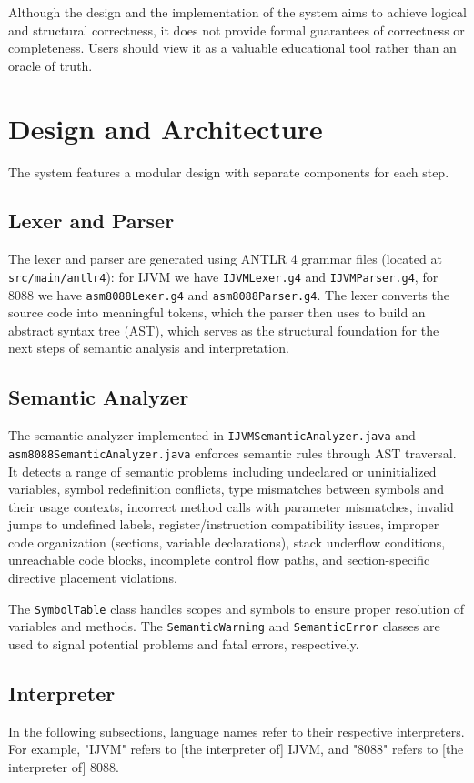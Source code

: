 \documentclass[11pt]{article}
\begin{document}
Although the design and the implementation of the system aims to achieve logical and structural correctness, it does not provide formal guarantees of correctness or completeness. Users should view it as a valuable educational tool rather than an oracle of truth.

\section{Design and Architecture}
The system features a modular design with separate components for each step.

\subsection{Lexer and Parser}
The lexer and parser are generated using ANTLR 4 grammar files (located at \texttt{src/main/antlr4}): for IJVM we have \texttt{IJVMLexer.g4} and \texttt{IJVMParser.g4}, for 8088 we have \texttt{asm8088Lexer.g4} and \texttt{asm8088Parser.g4}.  The lexer converts the source code into meaningful tokens, which the parser then uses to build an abstract syntax tree (AST), which serves as the structural foundation for the next steps of  semantic analysis and interpretation.

\subsection{Semantic Analyzer}
The semantic analyzer implemented in \texttt{IJVMSemanticAnalyzer.java} and \texttt{asm8088SemanticAnalyzer.java} enforces semantic rules through AST traversal. 
It detects a range of semantic problems including undeclared or uninitialized variables, symbol redefinition conflicts, type mismatches between symbols and their usage contexts, incorrect method calls with parameter mismatches, invalid jumps to undefined labels, register/instruction compatibility issues, improper code organization (sections, variable declarations), stack underflow conditions, unreachable code blocks, incomplete control flow paths, and section-specific directive placement violations. 

The \texttt{SymbolTable} class handles scopes and symbols to ensure proper resolution of variables and methods. The \texttt{SemanticWarning} and \texttt{SemanticError} classes are used to signal potential problems and fatal errors, respectively.

\subsection{Interpreter}
In the following subsections, language names refer to their respective interpreters. For example, "IJVM" refers to [the interpreter of] IJVM, and "8088" refers to [the interpreter of] 8088.
\end{document}
